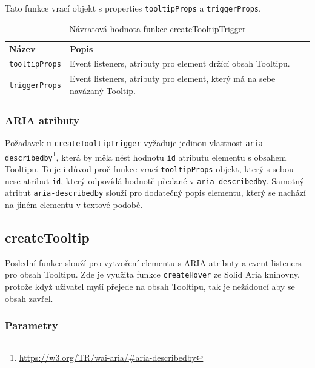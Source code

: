 Tato funkce vrací objekt s properties \texttt{tooltipProps} a \texttt{triggerProps}.

\begin{table}[ht]
    \begin{ctucolortab}
        \begin{tabularx}{\textwidth}{p{3cm} X}
            \bfseries Název       & \bfseries Popis                                                           \\\Midrule{}
            \texttt{tooltipProps} & Event listeners, atributy pro element držící obsah Tooltipu.              \\
            \texttt{triggerProps} & Event listeners, atributy pro element, který má na sebe navázaný Tooltip. \\
        \end{tabularx}
    \end{ctucolortab}
    \caption{Návratová hodnota funkce createTooltipTrigger}
    \label{table:tooltip-trigger-return}
\end{table}

\subsubsection{ARIA atributy}

Požadavek \hyperref[ofr12]{} u \texttt{createTooltipTrigger} vyžaduje jedinou vlastnost \texttt{aria-describedby}\footnote{\url{https://w3.org/TR/wai-aria/\#aria-describedby}}, která by měla nést hodnotu \texttt{id} atributu elementu s obsahem Tooltipu.
To je i důvod proč funkce vrací \texttt{tooltipProps} objekt, který s sebou nese atribut \texttt{id}, který odpovídá hodnotě předané v \texttt{aria-describedby}.
Samotný atribut \texttt{aria-describedby} slouží pro dodatečný popis elementu, který se nachází na jiném elementu v textové podobě.

\subsection{createTooltip}

Poslední funkce slouží pro vytvoření elementu s ARIA atributy a event listeners pro obsah Tooltipu.
Zde je využita funkce \texttt{createHover} ze Solid Aria knihovny, protože když uživatel myší přejede na obsah Tooltipu, tak je nežádoucí aby se obsah zavřel.

\subsubsection{Parametry}

